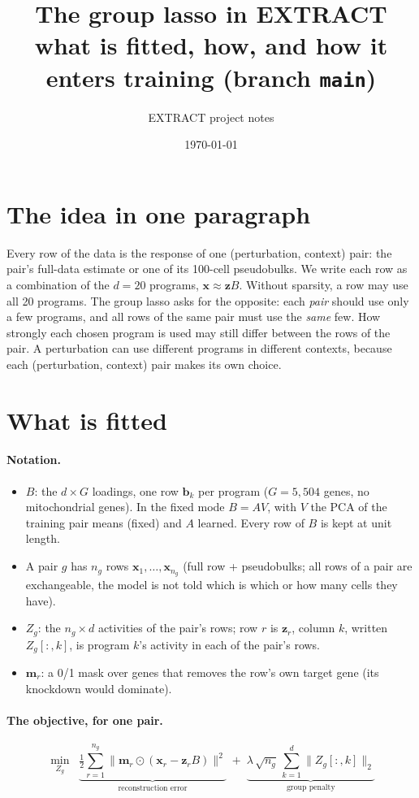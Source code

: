 \documentclass[11pt]{article}
\title{\textbf{The group lasso in EXTRACT}\\[2pt]\large what is fitted, how, and how it enters training (branch \texttt{main})}
\author{EXTRACT project notes}
\date{\today}
\newcommand{\x}{\mathbf{x}}
\newcommand{\z}{\mathbf{z}}
\newcommand{\m}{\mathbf{m}}
\begin{document}
\maketitle

\section{The idea in one paragraph}

Every row of the data is the response of one (perturbation, context) pair: the
pair's full-data estimate or one of its 100-cell pseudobulks. We write each row
as a combination of the $d=20$ programs, $\x \approx \z B$. Without sparsity, a
row may use all 20 programs. The group lasso asks for the opposite: each
\emph{pair} should use only a few programs, and all rows of the same pair must
use the \emph{same} few. How strongly each chosen program is used may still
differ between the rows of the pair. A perturbation can use different programs
in different contexts, because each (perturbation, context) pair makes its own
choice.

\section{What is fitted}

\paragraph{Notation.}
\begin{itemize}
  \item $B$: the $d\times G$ loadings, one row $\mathbf b_k$ per program
  ($G=5{,}504$ genes, no mitochondrial genes). In the fixed mode $B=AV$, with
  $V$ the PCA of the training pair means (fixed) and $A$ learned. Every row of
  $B$ is kept at unit length.
  \item A pair $g$ has $n_g$ rows $\x_1,\dots,\x_{n_g}$ (full row + pseudobulks;
  all rows of a pair are exchangeable, the model is not told which is which or
  how many cells they have).
  \item $Z_g$: the $n_g\times d$ activities of the pair's rows; row $r$ is
  $\z_r$, column $k$, written $Z_g[:,k]$, is program $k$'s activity in each of
  the pair's rows.
  \item $\m_r$: a 0/1 mask over genes that removes the row's own target gene
  (its knockdown would dominate).
\end{itemize}

\paragraph{The objective, for one pair.}
\begin{equation}
  \min_{Z_g}\;\;
  \underbrace{\tfrac12\sum_{r=1}^{n_g}\big\|\m_r\odot(\x_r-\z_r B)\big\|^2}_{\text{reconstruction error}}
  \;+\;
  \underbrace{\lambda\,\sqrt{n_g}\,\sum_{k=1}^{d}\big\|Z_g[:,k]\big\|_2}_{\text{group penalty}}
  \label{eq:gl}
\end{equation}
\end{document}
